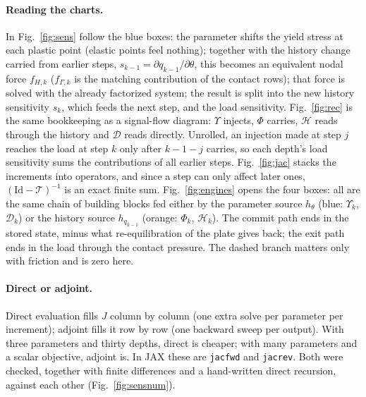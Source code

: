 \documentclass[11pt]{article}
\newcommand{\nb}[1]{\texttt{#1}}
\begin{document}
\paragraph{Reading the charts.} In Fig.~\ref{fig:sens} follow the blue boxes: the parameter shifts the yield
stress at each plastic point (elastic points feel nothing); together with the history change carried from
earlier steps, $s_{k-1}=\partial q_{k-1}/\partial\theta$, this becomes an equivalent nodal force $f_{H,k}$ ($f_{\Gamma,k}$
is the matching contribution of the contact rows); that force is solved with the already factorized system;
the result is split into the new history sensitivity $s_k$, which feeds the next step, and the load
sensitivity. Fig.~\ref{fig:rec} is the same bookkeeping as a signal-flow diagram: $\Upsilon$ injects, $\Phi$
carries, $\mathcal H$ reads through the history and $\mathcal D$ reads directly. Unrolled, an injection made at
step $j$ reaches the load at step $k$ only after $k-1-j$ carries, so each depth's load sensitivity sums the
contributions of all earlier steps. Fig.~\ref{fig:jac} stacks the increments into operators, and since a
step can only affect later ones, $(\mathrm{Id}-\mathcal T)^{-1}$ is an exact finite sum. Fig.~\ref{fig:engines}
opens the four boxes: all are the same chain of building blocks fed either by the parameter source $h_\theta$
(blue: $\Upsilon_k$, $\mathcal D_k$) or the history source $h_{q_{k-1}}$ (orange: $\Phi_k$, $\mathcal H_k$). The commit
path ends in the stored state, minus what re-equilibration of the plate gives back; the exit path ends in the
load through the contact pressure. The dashed branch matters only with friction and is zero here.

\paragraph{Direct or adjoint.} Direct evaluation fills $J$ column by column (one extra solve per
parameter per increment); adjoint fills it row by row (one backward sweep per output). With three
parameters and thirty depths, direct is cheaper; with many parameters and a scalar objective, adjoint is.
In JAX these are \nb{jacfwd} and \nb{jacrev}. Both were checked, together with finite differences and a
hand-written direct recursion, against each other (Fig.~\ref{fig:sensnum}).
\end{document}
